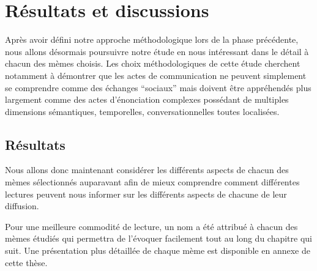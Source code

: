\chapter{R\'esultats et discussions}

Apr\`es avoir d\'efini notre approche m\'ethodologique lors de la phase
pr\'ec\'edente, nous allons d\'esormais poursuivre notre \'etude en
nous int\'eressant dans le d\'etail \`a chacun des m\`emes choisis. Les
choix m\'ethodologiques de cette \'etude cherchent notamment \`a
d\'emontrer que les actes de communication ne peuvent simplement se
comprendre comme des \'echanges
{\textquotedblleft}sociaux{\textquotedblright} mais doivent \^etre
appr\'ehend\'es plus largement comme des actes
d{\textquoteright}\'enonciation complexes poss\'edant de multiples
dimensions s\'emantiques, temporelles, conversationnelles toutes
localis\'ees.


\section{R\'esultats}
Nous allons donc maintenant consid\'erer les diff\'erents aspects de
chacun des m\`emes s\'electionn\'es auparavant afin de mieux comprendre
comment diff\'erentes lectures peuvent nous informer sur les
diff\'erents aspects de chacune de leur diffusion.


Pour une meilleure commodit\'e de lecture, un nom a \'et\'e attribu\'e
\`a chacun des m\`emes \'etudi\'es qui permettra de
l{\textquoteright}\'evoquer facilement tout au long du chapitre qui
suit. Une pr\'esentation plus d\'etaill\'ee de chaque m\`eme est
disponible en annexe de cette th\`ese.


